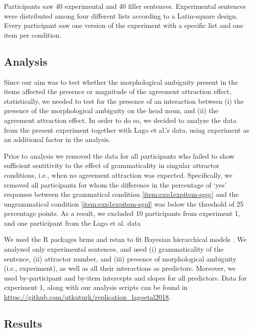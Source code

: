 \documentclass[doc,a4paper,man,natbib,floatsintext,noextraspace]{apa6}
\begin{document}
Participants saw 40 experimental and 40 filler sentences. Experimental sentences were distributed among four different lists according to a Latin-square design. Every participant saw one version of the experiment with a specific list and one item per condition.   

\subsection{Analysis} \label{sec:exp1:analysis}

Since our aim was to test whether the morphological ambiguity present in the \citet{LagoEtAl:2018} items affected the presence or magnitude of the agreement attraction effect, statistically, we needed to test for the presence of an interaction between 
(i) the presence of the morphological ambiguity on the head noun, and 
(ii) the agreement attraction effect. 
In order to do so, we decided to analyze the data from the present experiment together with Lago et al.'s data, using experiment as an additional factor in the analysis.


Prior to analysis we removed the data for all participants who failed to show sufficient sentitivity to the effect of grammaticality in singular attractor conditions, i.e., when no agreement attraction was expected. Specifically, we removed all participants for whom the difference in the percentage of `yes' responses between the grammatical condition \ref{item:exp1expitem-sgsg} and the ungrammatical condition \ref{item:exp1expitem-sgpl} was below the threshold of 25 percentage points. As a result, we excluded 10 participants from experiment 1, and  one participant from the Lago et al. data

We used the R packages brms \citep{R-brms_b} and rstan \citep{R-stan} to fit Bayesian hierarchical models \citep[e.g.,][]{GelmanHill:2007}. We analyzed only experimental sentences, and used 
(i) grammaticality of the sentence, 
(ii) attractor number, and 
(iii) presence of morphological ambiguity (i.e., experiment), as well as all their interactions as predictors. 
Moreover, we used by-participant and by-item intercepts and slopes for all predictors.
Data for experiment 1, along with our analysis scripts can be found in \url{https://github.com/utkuturk/replication_lagoetal2018}.


\subsection{Results} \label{sec:exp1:results}
\end{document}
